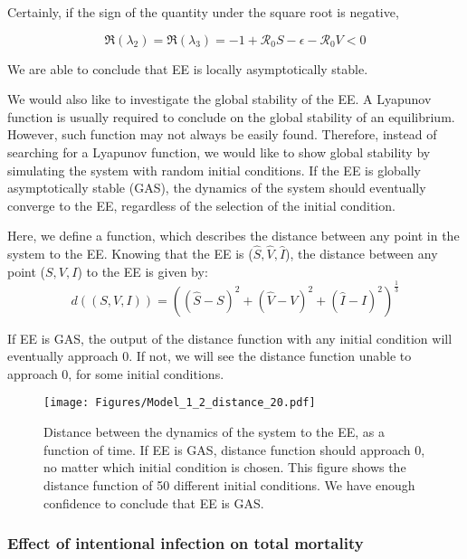 \documentclass[12pt]{article}
\newcommand{\R}{\mathcal{R}}
\begin{document}
Certainly, if the sign of the quantity under the square root is negative,
\begin{linenomath*}
\begin{equation}
\Re(\lambda_2)=\Re(\lambda_3)=-1+\R_0 S-\epsilon-\R_0 V<0
\end{equation}
\end{linenomath*}

We are able to conclude that EE is locally asymptotically stable.

We would also like to investigate the global stability of the EE. A Lyapunov function is usually required to conclude on the global stability of an equilibrium. However, such function may not always be easily found. Therefore, instead of searching for a Lyapunov function, we would like to show global stability by simulating the system with random initial conditions. If the EE is globally asymptotically stable (GAS), the dynamics of the system should eventually converge to the EE, regardless of the selection of the initial condition.

Here, we define a function, which describes the distance between any point in the system to the EE. Knowing that the EE is ($\hat{S}, \hat{V},\hat{I}$), the distance between any point ($S,V,I$) to the EE is given by:
\begin{equation}
d((S,V,I))=((\hat{S}-S)^2+(\hat{V}-V)^2+(\hat{I}-I)^2)^{\frac{1}{3}}
\end{equation}

If EE is GAS, the output of the distance function with any initial condition will eventually approach 0. If not, we will see the distance function unable to approach 0, for some initial conditions.

\begin{figure}[H]
  \centering
  \texttt{[image: Figures/Model\_1\_2\_distance\_20.pdf]}
  \caption{Distance between the dynamics of the system to the EE, as a function of time. If EE is GAS, distance function should approach 0, no matter which initial condition is chosen. This figure shows the distance function of 50 different initial conditions. We have enough confidence to conclude that EE is GAS.}
\end{figure}

\subsubsection{Effect of intentional infection on total mortality}\label{section2.2.3}
\end{document}
